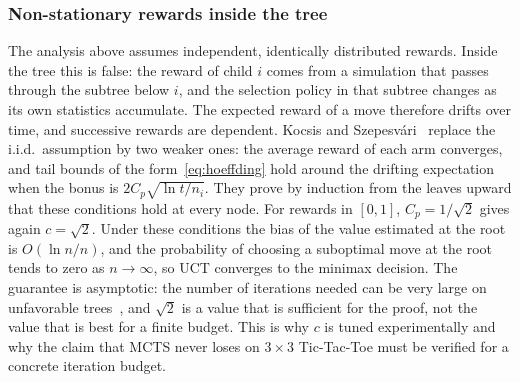 \subsubsection{Non-stationary rewards inside the tree}
The analysis above assumes independent, identically distributed rewards. Inside the tree this is false: the reward of child $i$ comes from a simulation that passes through the subtree below $i$, and the selection policy in that subtree changes as its own statistics accumulate. The expected reward of a move therefore drifts over time, and successive rewards are dependent. Kocsis and Szepesv\'ari~\cite{kocsis2006bandit} replace the i.i.d.\ assumption by two weaker ones: the average reward of each arm converges, and tail bounds of the form~\eqref{eq:hoeffding} hold around the drifting expectation when the bonus is $2C_p\sqrt{\ln t/n_i}$. They prove by induction from the leaves upward that these conditions hold at every node. For rewards in $[0,1]$, $C_p = 1/\sqrt{2}$ gives again $c = \sqrt{2}$. Under these conditions the bias of the value estimated at the root is $O(\ln n/n)$, and the probability of choosing a suboptimal move at the root tends to zero as $n \to \infty$, so UCT converges to the minimax decision. The guarantee is asymptotic: the number of iterations needed can be very large on unfavorable trees~\cite{coquelin2007bandit}, and $\sqrt{2}$ is a value that is sufficient for the proof, not the value that is best for a finite budget. This is why $c$ is tuned experimentally and why the claim that MCTS never loses on $3\times 3$ Tic-Tac-Toe must be verified for a concrete iteration budget.
